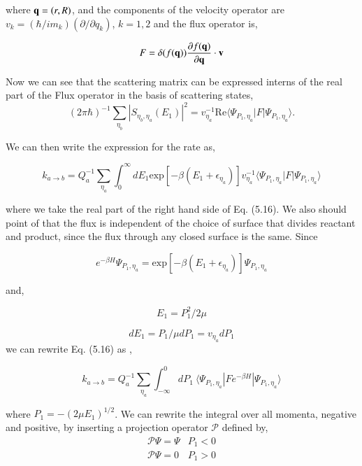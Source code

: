 \documentclass[phd,tocprelim]{cornell}
\begin{document}
where ${\bf{q}} =(r,R)$, and the components of the velocity operator are $v_k = (\hbar/im_k)(\partial/\partial q_k)$, $k=1,2$ and the flux operator is, 

\begin{equation}
F=\delta ( f({\bf{q}})) \frac{\partial f({\bf{q}})}{\partial {\bf{q}}} \cdot {\bf{v}}
\end{equation}

Now we can see that the scattering matrix can be expressed interns of the real part of the Flux operator in the basis of scattering states, 
\begin{equation}
(2\pi\hbar)^{-1} \sum_{\eta_b}|S_{\eta_b, \eta_a}(E_1)|^2 = v_{\eta_a}^{-1} \textrm{Re} \langle \Psi_{P_1, \eta_a}|F| \Psi_{P_1, \eta_a} \rangle. 
\end{equation}

We can then write the expression for the rate as, 

\begin{equation}
k_{a\to b} = Q_{a}^{-1}\sum_{\eta_a} \int_{0}^{\infty} dE_1 \textrm{exp}[-\beta(E_1 +\epsilon_{\eta_a})] v_{\eta_a}^{-1} \langle \Psi_{P_1, \eta_a}|F| \Psi_{P_1, \eta_a} \rangle
\end{equation}

where we take the real part of the right hand side of Eq. (5.16). We also should point of that the flux is independent of the choice of surface that divides reactant and product, since the flux through any closed surface is the same. Since 

\begin{equation}
e^{-\beta H} \Psi_{P_1, \eta_a} = \textrm{exp} [-\beta ( E_1+ \epsilon_{\eta_a})] \Psi_{P_1, \eta_a}
\end{equation}

and, 

\begin{equation}
E_1 =P_1^2/2\mu
\end{equation}

\begin{equation}
dE_1 =P_1/\mu dP_1 = v_{\eta_a} dP_1
\end{equation}
we can rewrite Eq. (5.16) as , 

\begin{equation}
k_{a\to b} = Q_{a}^{-1}\sum_{\eta_a} \int_{-\infty}^{0} dP_1 \ \langle \Psi_{P_1, \eta_a}|F e^{-\beta H} | \Psi_{P_1, \eta_a} \rangle
\end{equation}

where $P_1 = -(2\mu E_1)^{1/2}$. We can rewrite the integral over all momenta, negative and positive, by inserting a projection operator $\mathcal{P}$ defined by, 
\begin{equation}
     \begin{array}{ll}
      \mathcal{P}\Psi= \Psi& P_1<0\\
      \mathcal{P}\Psi= 0 &P_1>0
    \end{array}
    \label{eq:hs}
\end{equation}
\end{document}
